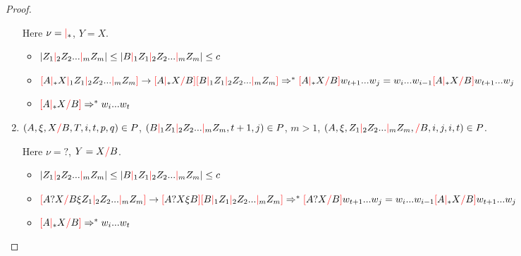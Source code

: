 \documentclass[12pt]{extarticle}
\theoremstyle{definition} \newtheorem{defn}{Definition}
\theoremstyle{definition} \newtheorem{prop}{Proposition}
\theoremstyle{definition} \newtheorem{property}{Property}
\newcommand{\rc}{\textcolor{red}{/}}
\newcommand{\mc}{\textcolor{red}{|}}
\newcommand{\lb}{\textcolor{red}{[}}
\newcommand{\rb}{\textcolor{red}{]}}
\begin{document}
\begin{proof}
\begin{enumerate}
        Here $\nu = \mc_*$, $Y = X$.
        \begin{itemize}
            \item $|Z_1 \mc_2 Z_2 ... \mc_m Z_m| \leq |B \mc_1 Z_1 \mc_2 Z_2 ... \mc_m Z_m| \leq c$
            \item $
                \lb A \mc_* X \mc_1 Z_1 \mc_2 Z_2 ... \mc_m Z_m \rb
                \rightarrow
                \lb A \mc_* X \rc B \rb \lb B \mc_1 Z_1 \mc_2 Z_2 ... \mc_m Z_m \rb
                \\
                \Rightarrow^* \lb A \mc_* X \rc B \rb w_{t + 1} ... w_j
                = w_i ... w_{i - 1} \lb A \mc_* X \rc B \rb w_{t + 1} ... w_j
                $
            \item $\lb A \mc_* X \rc B \rb \Rightarrow^* w_i ... w_t$
        \end{itemize}

    \item $(A, \xi, X \rc B, T, i, t, p, q) \in P$,
        $(B \mc_1 Z_1 \mc_2 Z_2 ... \mc_m Z_m, t + 1, j) \in P$,
        $m > 1$,
        $(A, \xi, Z_1 \mc_2 Z_2 ... \mc_m Z_m, \rc B, i, j, i, t) \in P$.

        Here $\nu = ?$, $Y = X \rc B$.
        \begin{itemize}
            \item $|Z_1 \mc_2 Z_2 ... \mc_m Z_m| \leq |B \mc_1 Z_1 \mc_2 Z_2 ... \mc_m Z_m| \leq c$
            \item $
                \lb A ? X \rc B \xi Z_1 \mc_2 Z_2 ... \mc_m Z_m \rb
                \rightarrow
                \lb A ? X \xi B \rb \lb B \mc_1 Z_1 \mc_2 Z_2 ... \mc_m Z_m \rb
                \\
                \Rightarrow^* \lb A ? X \rc B \rb w_{t + 1} ... w_j
                = w_i ... w_{i - 1} \lb A \mc_* X \rc B \rb w_{t + 1} ... w_j
                $
            \item $\lb A \mc_* X \rc B \rb \Rightarrow^* w_i ... w_t$
        \end{itemize}




\end{enumerate}
\end{proof}
\end{document}
